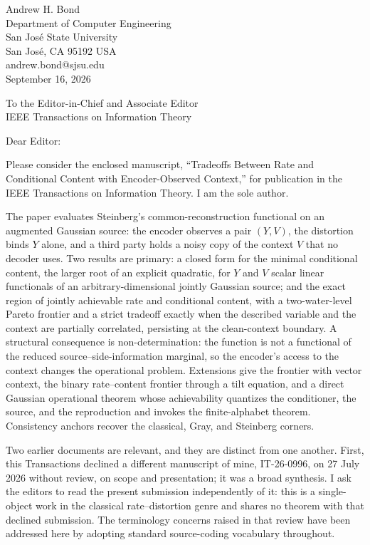 \documentclass[11pt]{article}
\begin{document}
\begin{flushright}
Andrew H. Bond\\
Department of Computer Engineering\\
San Jos\'e State University\\
San Jos\'e, CA 95192 USA\\
andrew.bond@sjsu.edu\\[0.8em]
September 16, 2026
\end{flushright}

To the Editor-in-Chief and Associate Editor\\
IEEE Transactions on Information Theory

Dear Editor:

Please consider the enclosed manuscript, ``Tradeoffs Between Rate and
Conditional Content with Encoder-Observed Context,'' for publication in the IEEE
Transactions on Information Theory. I am the sole author.

The paper evaluates Steinberg's common-reconstruction functional on an
augmented Gaussian source: the encoder observes a pair $(Y,V)$, the
distortion binds $Y$ alone, and a third party holds a noisy copy of the
context $V$ that no decoder uses. Two results are primary: a closed form
for the minimal conditional content, the larger root of an explicit
quadratic, for $Y$ and $V$ scalar linear functionals of an
arbitrary-dimensional jointly Gaussian source; and the exact region of
jointly achievable rate and conditional content, with a two-water-level
Pareto frontier and a strict tradeoff exactly when the described variable
and the context are partially correlated, persisting at the clean-context
boundary. A structural consequence is non-determination: the function is
not a functional of the reduced source--side-information marginal, so the
encoder's access to the context changes the operational problem.
Extensions give the frontier with vector context, the binary
rate--content frontier through a tilt equation, and a direct Gaussian
operational theorem whose achievability quantizes the conditioner, the
source, and the reproduction and invokes the finite-alphabet theorem. Consistency anchors
recover the classical, Gray, and Steinberg corners.

Two earlier documents are relevant, and they are distinct from one
another. First, this Transactions declined a different manuscript of
mine, IT-26-0996, on 27 July 2026 without review, on scope and
presentation; it was a broad synthesis. I ask the editors to read the
present submission independently of it: this is a single-object work in
the classical rate--distortion genre and shares no theorem with that
declined submission. The terminology concerns raised in that review have
been addressed here by adopting standard source-coding vocabulary
throughout.
\end{document}
